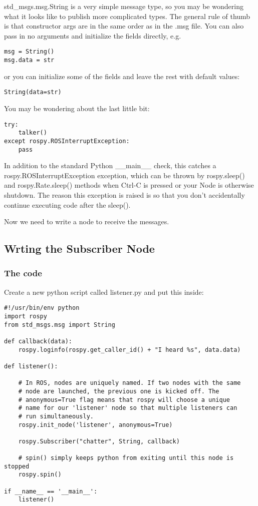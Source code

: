 std\_msgs.msg.String is a very simple message type, so you may be wondering what it looks like to publish more complicated types. The general rule of thumb is that constructor args are in the same order as in the .msg file. You can also pass in no arguments and initialize the fields directly, e.g.

\begin{lstlisting}[breaklines=true languages=python]
msg = String()
msg.data = str
\end{lstlisting}

or you can initialize some of the fields and leave the rest with default values:

\begin{lstlisting}[breaklines=true languages=python]
String(data=str)
\end{lstlisting}

You may be wondering about the last little bit:

\begin{lstlisting}[breaklines=true languages=python]
try:
	talker()
except rospy.ROSInterruptException:
	pass
\end{lstlisting}

In addition to the standard Python \_\_main\_\_ check, this catches a rospy.ROSInterruptException exception, which can be thrown by rospy.sleep() and rospy.Rate.sleep() methods when Ctrl-C is pressed or your Node is otherwise shutdown. The reason this exception is raised is so that you don't accidentally continue executing code after the sleep().

Now we need to write a node to receive the messages.

\subsection{Wrting the Subscriber Node}

\subsubsection{The code}

Create a new python script called listener.py and put this inside:

\begin{lstlisting}[breaklines=true languages=python]
#!/usr/bin/env python
import rospy
from std_msgs.msg import String

def callback(data):
	rospy.loginfo(rospy.get_caller_id() + "I heard %s", data.data)

def listener():

	# In ROS, nodes are uniquely named. If two nodes with the same
	# node are launched, the previous one is kicked off. The
	# anonymous=True flag means that rospy will choose a unique
	# name for our 'listener' node so that multiple listeners can
	# run simultaneously.
	rospy.init_node('listener', anonymous=True)
	
	rospy.Subscriber("chatter", String, callback)
	
	# spin() simply keeps python from exiting until this node is stopped
	rospy.spin()

if __name__ == '__main__':
	listener()
\end{lstlisting}

